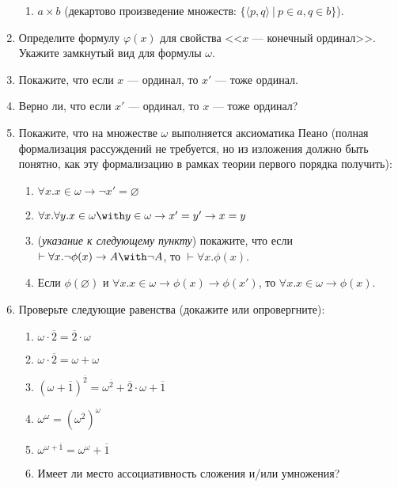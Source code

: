 \documentclass[10pt,a4paper,oneside]{article}
\begin{document}
\begin{enumerate}
\begin{enumerate}
\item $a \times b$ (декартово произведение множеств: $\{\langle p,q\rangle\ |\ p\in a, q\in b\}$).
\end{enumerate}
\item Определите формулу $\varphi(x)$ для свойства <<$x$ --- конечный ординал>>. Укажите замкнутый
вид для формулы $\omega$.
\item Покажите, что если $x$ --- ординал, то $x'$ --- тоже ординал.
\item Верно ли, что если $x'$ --- ординал, то $x$ --- тоже ординал?
\item Покажите, что на множестве $\omega$ выполняется аксиоматика Пеано (полная формализация рассуждений не требуется,
но из изложения должно быть понятно, как эту формализацию в рамках теории первого порядка получить):
\begin{enumerate}
\item $\forall x.x \in \omega \rightarrow \neg x' = \varnothing$
\item $\forall x.\forall y.x \in \omega \with y \in \omega \rightarrow x' = y' \rightarrow x = y$
\item (\emph{указание к следующему пункту}) покажите, что если $\vdash\forall x.\neg\phi(x)\rightarrow A\with\neg A$, то $\vdash\forall x.\phi(x)$.
\item Если $\phi(\varnothing)$ и $\forall x.x \in \omega \rightarrow \phi(x) \rightarrow \phi(x')$, 
то $\forall x.x \in \omega \rightarrow \phi(x)$.
\end{enumerate}
\item Проверьте следующие равенства (докажите или опровергните):
\begin{enumerate}
\item $\omega\cdot\overline{2} = \overline{2}\cdot\omega$
\item $\omega\cdot\overline{2} = \omega + \omega$
\item $(\omega+\overline{1})^{\overline{2}} = \omega^{\overline{2}} + \overline{2}\cdot \omega + \overline{1}$
\item $\omega ^ \omega = (\omega ^ {\overline{2}}) ^ \omega$
\item $\omega ^ {\omega + \overline{1}} = \omega ^ \omega + \overline{1}$
\item Имеет ли место ассоциативность сложения и/или умножения?
\end{enumerate}
\end{enumerate}
\end{document}

